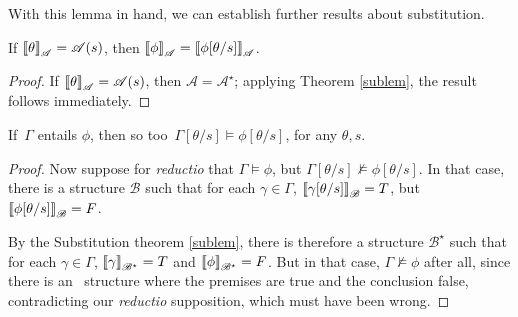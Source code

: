With this lemma in hand, we can establish further results about substitution.
\begin{theorem}
	If $\left\llbracket \theta\right\rrbracket_{\mathscr{A}} = \mathscr{A}(s)$, then $\left\llbracket \phi\right\rrbracket_{\mathscr{A}} = \left\llbracket \phi[\theta/s]\right\rrbracket_{\mathscr{A}}$. \begin{proof}
		If $\left\llbracket \theta\right\rrbracket_{\mathscr{A}} = \mathscr{A}(s)$, then $\mathscr{A}=\mathscr{A}^{\star}$; applying Theorem \ref{sublem}, the result follows immediately.
	\end{proof}
\end{theorem}
\begin{theorem}\label{substitution} If\, $\Gamma$ entails $\phi$, then so too\, $\Gamma[\theta/s] \vDash \phi[\theta/s]$, for any $\theta, s$.
\begin{proof}
	Now suppose for \emph{reductio} that $\Gamma \vDash \phi$, but $\Gamma[\theta/s] \nvDash \phi[\theta/s]$. In that case, there is a structure $\mathscr{B}$ such that for each $\gamma \in \Gamma$, $\left\llbracket \gamma[\theta/s]\right\rrbracket_{\mathscr{B}}=T$, but $\left\llbracket \phi[\theta/s]\right\rrbracket_{\mathscr{B}}=F$.

	By the Substitution theorem \ref{sublem}, there is therefore a structure $\mathscr{B}^{\star}$ such that for each $\gamma \in \Gamma$, $\left\llbracket \gamma\right\rrbracket_{\mathscr{B^{\star}}}=T$ and $\left\llbracket \phi\right\rrbracket_{\mathscr{B^{\star}}}=F$. But in that case, $\Gamma \nvDash \phi$ after all, since there is an \lone\ structure where the premises are true and the conclusion false, contradicting our \emph{reductio} supposition, which must have been wrong.
\end{proof}
\end{theorem}
